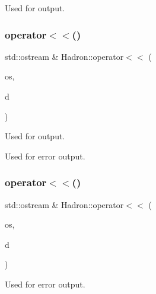 Used for output. 

\mbox{\label{namespaceHadron_ad9b3f6b8246d630d96e54032def25900}} 
\subsubsection{\texorpdfstring{operator$<$$<$()}{operator<<()}\hspace{0.1cm}{\footnotesize\ttfamily [18/48]}}
{\footnotesize\ttfamily std\+::ostream \& Hadron\+::operator$<$$<$ (\begin{DoxyParamCaption}\item[{std\+::ostream \&}]{os,  }\item[{const \mbox{\hyperlink{structHadron_1_1HadronAdjMapTarget__t}{Hadron\+Adj\+Map\+Target\+\_\+t}} \&}]{d }\end{DoxyParamCaption})}



Used for output. 

Used for error output. \mbox{\label{namespaceHadron_ae69192d40800d30f5ef75a6d3ce3ae6e}} 
\subsubsection{\texorpdfstring{operator$<$$<$()}{operator<<()}\hspace{0.1cm}{\footnotesize\ttfamily [19/48]}}
{\footnotesize\ttfamily std\+::ostream \& Hadron\+::operator$<$$<$ (\begin{DoxyParamCaption}\item[{std\+::ostream \&}]{os,  }\item[{const \mbox{\hyperlink{structHadron_1_1KeyUnsmearedMesonElementalOperator__t}{Key\+Unsmeared\+Meson\+Elemental\+Operator\+\_\+t}} \&}]{d }\end{DoxyParamCaption})}



Used for error output. 

\mbox{\label{namespaceHadron_aa9e7054b51bfae4b2afe5aeb8f904b2b}} 
